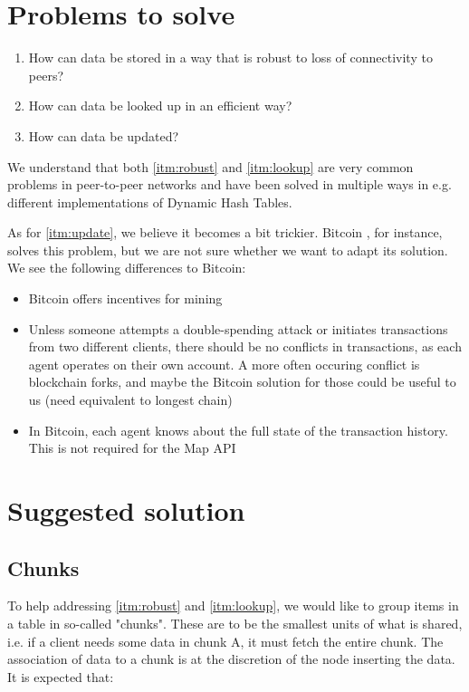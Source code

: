 \documentclass{article}
\begin{document}
\section{Problems to solve}

\begin{enumerate}
  \itemsep0em
  \item \label{itm:robust} How can data be stored in a way that is robust to 
    loss of connectivity to peers?
  \item \label{itm:lookup} How can data be looked up in an efficient way?
  \item \label{itm:update} How can data be updated?
\end{enumerate}

We understand that both \ref{itm:robust} and \ref{itm:lookup} are very common
problems in peer-to-peer networks and have been solved in multiple ways in
e.g. different implementations of Dynamic Hash Tables.

As for \ref{itm:update}, we believe it becomes a bit trickier. Bitcoin 
\cite{bitcoin}, for instance, solves this problem, but we are not sure whether
we want to adapt its solution. We see the following differences to Bitcoin:

\begin{itemize}
  \itemsep0em
  \item Bitcoin offers incentives for mining
  \item Unless someone attempts a double-spending attack or initiates
    transactions from two different clients, there should be no conflicts in
    transactions, as each agent operates on their own account. A more often 
    occuring conflict is blockchain forks, and maybe the Bitcoin solution for 
    those could be useful to us (need equivalent to longest chain)
  \item In Bitcoin, each agent knows about the full state of the transaction
    history. This is not required for the Map API
\end{itemize}

\section{Suggested solution}

\subsection{Chunks}

To help addressing \ref{itm:robust} and \ref{itm:lookup}, we would like to
group items in a table in so-called "chunks". These are to be the smallest units
of what is shared, i.e. if a client needs some data in chunk A, it must fetch
the entire chunk. The association of data to a chunk
is at the discretion of the node inserting the data. It is expected that:
\end{document}
